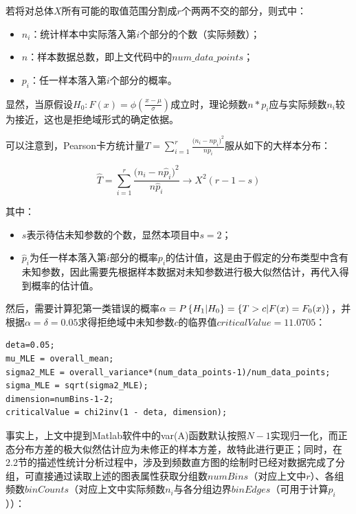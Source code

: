 \documentclass[12pt]{article}  %
\begin{document}
若将对总体$X$所有可能的取值范围分割成$r$个两两不交的部分，则式中：

\begin{itemize}
	\setlength{\parsep}{0ex} %
	\setlength{\topsep}{2ex} %
	\setlength{\itemsep}{1ex} %
	\item \textbf{$n_i$}：统计样本中实际落入第$i$个部分的个数（实际频数）；		
	\item \textbf{$n$}：样本数据总数，即上文代码中的$num\_data\_points$；
	\item \textbf{$p_i$}：任一样本落入第$i$个部分的概率。
\end{itemize}

显然，当原假设$H_0: F(x) = \phi(\frac{x-\mu}{\sigma})$成立时，理论频数$n*p_i$应与实际频数$n_i$较为接近，这也是拒绝域形式的确定依据。

可以注意到，Pearson卡方统计量$T=\sum_{i=1}^{r}\frac{{{(n_i-np}_i)}^2}{np_i}$服从如下的大样本分布：

\begin{equation}
\hat{T}=\sum_{i=1}^{r}\frac{{{(n_i-n\hat{p}}_i)}^2}{n{\hat{p}}_i}\rightarrow X^2(r-1-s)
\end{equation}

其中：
\begin{itemize}
	\setlength{\parsep}{0ex} %
	\setlength{\topsep}{2ex} %
	\setlength{\itemsep}{1ex} %
	\item $s$表示待估未知参数的个数，显然本项目中$s=2$；		
	\item ${\hat{p}}_i$为任一样本落入第$i$部分的概率$p_i$的估计值，这是由于假定的分布类型中含有未知参数，因此需要先根据样本数据对未知参数进行极大似然估计，再代入得到概率的估计值。
\end{itemize}

然后，需要计算犯第一类错误的概率$\alpha=P \left\{H_1|H_0\right\} = \left\{T>c|\\F(x)=F_0(x)\right\}$，并根据$\alpha = \delta = 0.05$求得拒绝域中未知参数$c$的临界值$criticalValue = 11.0705$：

\begin{lstlisting}
deta=0.05;
mu_MLE = overall_mean;
sigma2_MLE = overall_variance*(num_data_points-1)/num_data_points; 
sigma_MLE = sqrt(sigma2_MLE);
dimension=numBins-1-2;
criticalValue = chi2inv(1 - deta, dimension);
\end{lstlisting}

事实上，上文中提到Matlab软件中的var(A)函数默认按照$N-1$实现归一化，而正态分布方差的极大似然估计应为未修正的样本方差，故特此进行更正；同时，在2.2节的描述性统计分析过程中，涉及到频数直方图的绘制时已经对数据完成了分组，可直接通过读取上述的图表属性获取分组数$numBins$（对应上文中$r$）、各组频数$binCounts$（对应上文中实际频数$n_i$与各分组边界$binEdges$（可用于计算$p_i$））：
\end{document}

